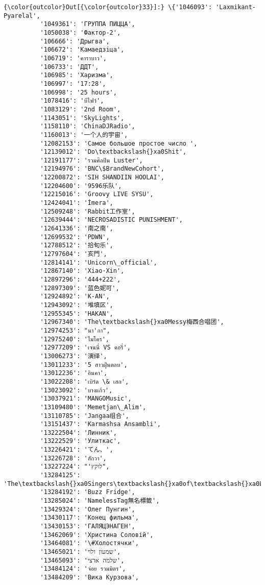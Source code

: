 \documentclass[11pt]{ctexart}
\begin{document}
\begin{Verbatim}[commandchars=\\\{\}]
{\color{outcolor}Out[{\color{outcolor}33}]:} \{'1046093': 'Laxmikant-Pyarelal',
          '1049361': 'ГРУППА ПИЦЦА',
          '1050038': 'Фактор-2',
          '106666': 'Дрыгва',
          '106672': 'Камаедзiца',
          '106719': 'คาราบาว',
          '106733': 'ДДТ',
          '106985': 'Харизма',
          '106997': '17:28',
          '106998': '25 hours',
          '1078416': 'บีไฟว์',
          '1083129': '2nd Room',
          '1143051': 'SkyLights',
          '1158110': 'ChinaDJRadio',
          '1160013': '一个人的宇宙',
          '12082153': 'Самое большое простое число ',
          '12139012': 'Do\textbackslash{}xa0Shit',
          '12191177': 'รวมศิลปิน Luster',
          '12194976': 'BNC\$BrandNewCohort',
          '12200872': 'SIH SHANDIIN HOOLAI',
          '12204600': '9596乐队',
          '12215016': 'Groovy LIVE SYSU',
          '12424041': 'İmera',
          '12509248': 'Rabbit工作室',
          '12639444': 'NECROSADISTIC PUNISHMENT',
          '12641336': '南之南',
          '12699532': 'PDWN',
          '12788512': '拾旬乐',
          '12797604': '亥門',
          '12814141': 'Unicorn\_official',
          '12867140': 'Xiao·Xin',
          '12897296': '444+222',
          '12897309': '蓝色妮可',
          '12924892': 'K-AN',
          '12943092': '堆填区',
          '12955345': 'HAKAN',
          '12967340': 'The\textbackslash{}xa0Messy梅西合唱团',
          '12974253': "นา'กา",
          '12975240': 'ไมโคร',
          '12977209': 'เจนนี่ VS คอรี่',
          '13006273': '演绎',
          '13011233': '5 สาวฝุ่นตลบ',
          '13012236': 'อินคา',
          '13022208': 'เบิร์ด \& เสก',
          '13023092': 'บางแก้ว',
          '13037921': 'MANGOMusic',
          '13109480': 'Memetjan\_Alim',
          '13110785': 'Jangaa组合',
          '13151437': 'Karmashsa Ansambli',
          '13222504': 'Линник',
          '13222529': 'Улиткас',
          '13226421': 'てん、',
          '13226728': 'สักวา',
          '13227224': "'לוקץ",
          '13284125': 'The\textbackslash{}xa0Singers\textbackslash{}xa0of\textbackslash{}xa0Lights',
          '13284192': 'Buzz Fridge',
          '13285024': 'NamelessTag無名標籤',
          '13429324': 'Олег Пунгин',
          '13430117': 'Конец фильма',
          '13430153': 'ГАЛЯЦЭНАГЕН',
          '13462069': 'Христина Соловій',
          '13464081': '\#Холостячки',
          '13465021': 'שמעון ולוי',
          '13465093': 'שלמה ארצי',
          '13484124': 'จ่อย รวมมิตร',
          '13484209': 'Вика Курзова',

\end{Verbatim}
\end{document}
